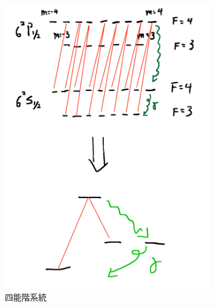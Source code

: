 \documentclass[11pt,a4paper]{article}
\begin{document}
\begin{figure}[H]
\begin{subfigure}[b]{0.3\textwidth}
\includegraphics[width=\textwidth]{small_system/four.pdf}
\caption{四能階系統}
\label{fig:four_level}
\end{subfigure}
\begin{subfigure}[b]{0.3\textwidth}
\centering

\end{subfigure}
\end{figure}
\end{document}
